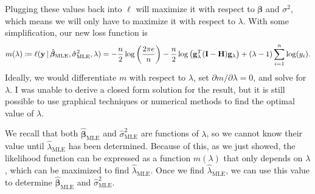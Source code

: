 \documentclass[10pt]{article}
\begin{document}
\begin{itemize}
    Plugging these values back into \(\ell\) will maximize it with respect to \(\bm{\beta}\) and \(\sigma^2\), 
    which means we will only have to maximize it with respect to \(\lambda\). 
    With some simplification, our new loss function is 
    \begin{align*}
        m(\lambda)
        \coloneqq \ell(\mathbf{y} \,|\, \hat{\bm{\beta}}_{\mathrm{MLE}}, \hat{\sigma}^2_{\mathrm{MLE}}, \lambda)
        = - \frac{n}{2} \log \left( \frac{2 \pi e}{n} \right) - \frac{n}{2} \log \big( \mathbf{g}_{\lambda}^T(\mathbf{I} - \mathbf{H}) \mathbf{g}_{\lambda} \big) + (\lambda - 1) \sum_{i=1}^n \log(y_i).
    \end{align*}
    Ideally, we would differentiate \(m\) with respect to \(\lambda\), set \(\partial m / \partial \lambda = 0\), and solve for \(\lambda\). I was unable to 
    derive a closed form solution for the result, but it is still possible to use graphical techniques or numerical methods to find the optimal value of \(\lambda\). 

    We recall that both \(\hat{\bm{\beta}}_{\mathrm{MLE}}\) and \(\hat{\sigma}^2_{\mathrm{MLE}}\) are functions of \(\lambda\), so we cannot know their value until \(\hat{\lambda}_{\mathrm{MLE}}\) has been determined.
    Because of this, as we just showed, the likelihood function can be expressed as a function \(m(\lambda)\) that only depends on \(\lambda\), which can be maximized to find \(\hat{\lambda}_{\mathrm{MLE}}\). 
    Once we find \(\hat{\lambda}_{\mathrm{MLE}}\), we can use this value to determine \(\hat{\bm{\beta}}_{\mathrm{MLE}}\) and \(\hat{\sigma}^2_{\mathrm{MLE}}\). 



\end{itemize}
\end{document}
